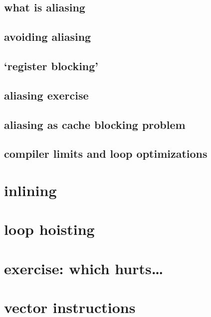 \subsection{what is aliasing}


\subsection{avoiding aliasing}

\subsection{`register blocking'}
 

\subsection{aliasing exercise}


\subsection{aliasing as cache blocking problem}



\subsection{compiler limits and loop optimizations} %


\section{inlining}



\section{loop hoisting}



\section{exercise: which hurts\ldots}


\section{vector instructions}


